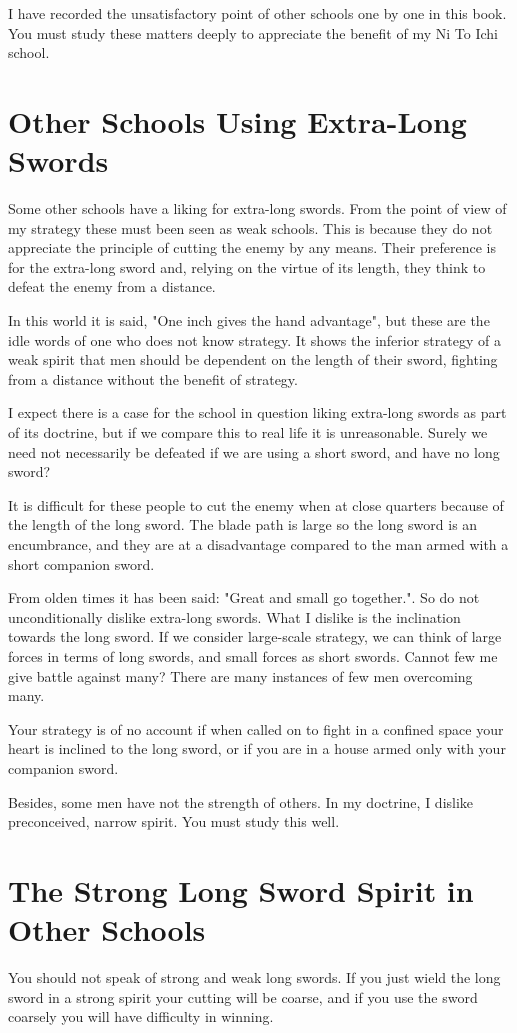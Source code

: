 \documentclass[12pt]{report}
\begin{document}
I have recorded the unsatisfactory point of other schools one by one in this book. You must study these matters deeply to appreciate the benefit of my Ni To Ichi school.
\section*{Other Schools Using Extra-Long Swords}
Some other schools have a liking for extra-long swords. From the point of view of my strategy these must been seen as weak schools. This is because they do not appreciate the principle of cutting the enemy by any means. Their preference is for the extra-long sword and, relying on the virtue of its length, they think to defeat the enemy from a distance.

In this world it is said, "One inch gives the hand advantage", but these are the idle words of one who does not know strategy. It shows the inferior strategy of a weak spirit that men should be dependent on the length of their sword, fighting from a distance without the benefit of strategy.

I expect there is a case for the school in question liking extra-long swords as part of its doctrine, but if we compare this to real life it is unreasonable. Surely we need not necessarily be defeated if we are using a short sword, and have no long sword?

It is difficult for these people to cut the enemy when at close quarters because of the length of the long sword. The blade path is large so the long sword is an encumbrance, and they are at a disadvantage compared to the man armed with a short companion sword.

From olden times it has been said: "Great and small go together.". So do not unconditionally dislike extra-long swords. What I dislike is the inclination towards the long sword. If we consider large-scale strategy, we can think of large forces in terms of long swords, and small forces as short swords. Cannot few me give battle against many? There are many instances of few men overcoming many.

Your strategy is of no account if when called on to fight in a confined space your heart is inclined to the long sword, or if you are in a house armed only with your companion sword.

Besides, some men have not the strength of others. In my doctrine, I dislike preconceived, narrow spirit. You must study this well.
\section*{The Strong Long Sword Spirit in Other Schools}
You should not speak of strong and weak long swords. If you just wield the long sword in a strong spirit your cutting will be coarse, and if you use the sword coarsely you will have difficulty in winning.
\end{document}
